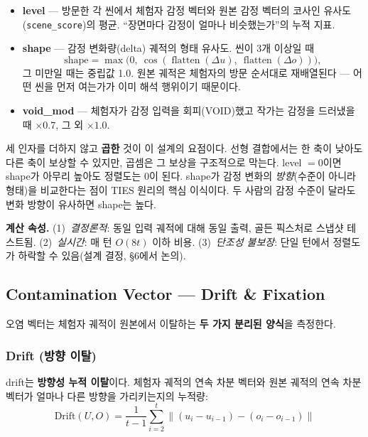 \documentclass[11pt, a4paper]{article}
\begin{document}
\begin{itemize}
  \item \textbf{level} --- 방문한 각 씬에서 체험자 감정 벡터와 원본 감정 벡터의 코사인 유사도(\texttt{scene\_score})의 평균. ``장면마다 감정이 얼마나 비슷했는가''의 누적 지표.
  \item \textbf{shape} --- 감정 변화량(delta) 궤적의 형태 유사도. 씬이 3개 이상일 때
  \[ \text{shape} = \max\!\big(0,\ \cos(\operatorname{flatten}(\Delta u),\ \operatorname{flatten}(\Delta o))\big), \]
  그 미만일 때는 중립값 1.0. 원본 궤적은 체험자의 방문 순서대로 재배열된다 --- 어떤 씬을 먼저 여는가가 이미 해석 행위이기 때문이다.
  \item \textbf{void\_mod} --- 체험자가 감정 입력을 회피(VOID)했고 작가는 감정을 드러냈을 때 $\times 0.7$, 그 외 $\times 1.0$.
\end{itemize}

세 인자를 더하지 않고 \textbf{곱한} 것이 이 설계의 요점이다. 선형 결합에서는 한 축이 낮아도 다른 축이 보상할 수 있지만, 곱셈은 그 보상을 구조적으로 막는다. level $= 0$이면 shape가 아무리 높아도 정렬도는 0이 된다. shape가 감정 변화의 \textit{방향}(수준이 아니라 형태)을 비교한다는 점이 TIES 원리의 핵심 이식이다. 두 사람의 감정 수준이 달라도 변화 방향이 유사하면 shape는 높다.

\noindent\textbf{계산 속성.} (1)~\textit{결정론적}: 동일 입력 궤적에 대해 동일 출력, 골든 픽스처로 스냅샷 테스트됨. (2)~\textit{실시간}: 매 턴 $O(8t)$ 이하 비용. (3)~\textit{단조성 불보장}: 단일 턴에서 정렬도가 하락할 수 있음(설계 결정, \S6에서 논의).

\subsection{Contamination Vector --- Drift \& Fixation}

오염 벡터는 체험자 궤적이 원본에서 이탈하는 \textbf{두 가지 분리된 양식}을 측정한다.

\subsubsection{Drift (방향 이탈)}
drift는 \textbf{방향성 누적 이탈}이다. 체험자 궤적의 연속 차분 벡터와 원본 궤적의 연속 차분 벡터가 얼마나 다른 방향을 가리키는지의 누적량:
\begin{equation}
\text{Drift}(U, O) = \frac{1}{t-1} \sum_{i=2}^{t} \left\| (u_i - u_{i-1}) - (o_i - o_{i-1}) \right\|
\end{equation}
\end{document}
